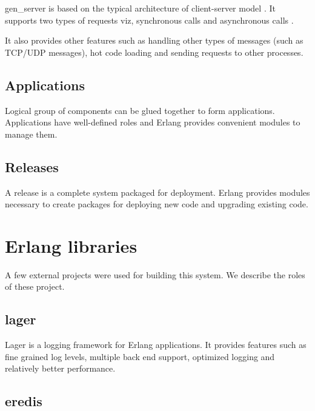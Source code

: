 gen\_server is based on the typical architecture of client-server model
\citep{reliable.dist.sys}. It supports two types of requests viz, synchronous
calls%
and asynchronous calls%
.

It also provides other features such as handling other types of messages (such
as TCP/UDP messages), hot code loading and sending requests to other
processes.

\subsection{Applications}
\label{section:concepts.applications}
Logical group of components can be glued together to form applications.
Applications have well-defined roles and Erlang provides convenient modules to
manage them.

\subsection{Releases}
\label{section:concepts.releases}
A release is a complete system packaged for deployment. Erlang provides modules
necessary to create packages for deploying new code and upgrading existing code.

\section{Erlang libraries}

A few external projects were used for building this system. We describe the
roles of these project.

\subsection{lager}

Lager \citep{lager} is a logging framework for Erlang applications. It provides
features such as fine grained log levels, multiple back end support, optimized
logging and relatively better performance.

\subsection{eredis}

